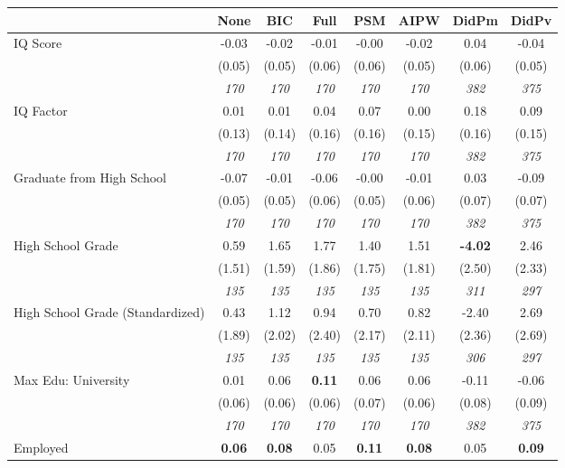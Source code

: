 \begin{tabular}{l c c c c c c c}
\toprule
 & None & BIC & Full & PSM & AIPW & DidPm & DidPv \\
\midrule
IQ Score & -0.03 & -0.02 & -0.01 & -0.00 & -0.02 & 0.04 & -0.04 \\
& (0.05) & (0.05) & (0.06) & (0.06) & (0.05) & (0.06) & (0.05) \\
& \textit{ 170 } & \textit{ 170 } & \textit{ 170 } & \textit{ 170 } & \textit{ 170 } & \textit{ 382 } & \textit{ 375 } \\
IQ Factor & 0.01 & 0.01 & 0.04 & 0.07 & 0.00 & 0.18 & 0.09 \\
& (0.13) & (0.14) & (0.16) & (0.16) & (0.15) & (0.16) & (0.15) \\
& \textit{ 170 } & \textit{ 170 } & \textit{ 170 } & \textit{ 170 } & \textit{ 170 } & \textit{ 382 } & \textit{ 375 } \\
Graduate from High School & -0.07 & -0.01 & -0.06 & -0.00 & -0.01 & 0.03 & -0.09 \\
& (0.05) & (0.05) & (0.06) & (0.05) & (0.06) & (0.07) & (0.07) \\
& \textit{ 170 } & \textit{ 170 } & \textit{ 170 } & \textit{ 170 } & \textit{ 170 } & \textit{ 382 } & \textit{ 375 } \\
High School Grade & 0.59 & 1.65 & 1.77 & 1.40 & 1.51 & \textbf{ -4.02 } & 2.46 \\
& (1.51) & (1.59) & (1.86) & (1.75) & (1.81) & (2.50) & (2.33) \\
& \textit{ 135 } & \textit{ 135 } & \textit{ 135 } & \textit{ 135 } & \textit{ 135 } & \textit{ 311 } & \textit{ 297 } \\
High School Grade (Standardized) & 0.43 & 1.12 & 0.94 & 0.70 & 0.82 & -2.40 & 2.69 \\
& (1.89) & (2.02) & (2.40) & (2.17) & (2.11) & (2.36) & (2.69) \\
& \textit{ 135 } & \textit{ 135 } & \textit{ 135 } & \textit{ 135 } & \textit{ 135 } & \textit{ 306 } & \textit{ 297 } \\
Max Edu: University & 0.01 & 0.06 & \textbf{ 0.11 } & 0.06 & 0.06 & -0.11 & -0.06 \\
& (0.06) & (0.06) & (0.06) & (0.07) & (0.06) & (0.08) & (0.09) \\
& \textit{ 170 } & \textit{ 170 } & \textit{ 170 } & \textit{ 170 } & \textit{ 170 } & \textit{ 382 } & \textit{ 375 } \\
Employed & \textbf{ 0.06 } & \textbf{ 0.08 } & 0.05 & \textbf{0.11} & \textbf{0.08} & 0.05 & \textbf{ 0.09 } \\

\end{tabular}
